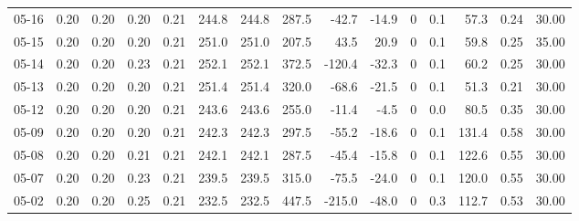 \begin{threeparttable}
{\begin{tabular}{lrrrrrrrrrrrrrr}
  05-16 &          0.20 &          0.20 &          0.20 &        0.21 &               244.8 &              244.8 &               287.5 &      -42.7 &        -14.9 &              0 &                 0.1 &             57.3 &            0.24 &                  30.00 \\
  05-15 &          0.20 &          0.20 &          0.20 &        0.21 &               251.0 &              251.0 &               207.5 &       43.5 &         20.9 &              0 &                 0.1 &             59.8 &            0.25 &                  35.00 \\
  05-14 &          0.20 &          0.20 &          0.23 &        0.21 &               252.1 &              252.1 &               372.5 &     -120.4 &        -32.3 &              0 &                 0.1 &             60.2 &            0.25 &                  30.00 \\
  05-13 &          0.20 &          0.20 &          0.20 &        0.21 &               251.4 &              251.4 &               320.0 &      -68.6 &        -21.5 &              0 &                 0.1 &             51.3 &            0.21 &                  30.00 \\
  05-12 &          0.20 &          0.20 &          0.20 &        0.21 &               243.6 &              243.6 &               255.0 &      -11.4 &         -4.5 &              0 &                 0.0 &             80.5 &            0.35 &                  30.00 \\
  05-09 &          0.20 &          0.20 &          0.20 &        0.21 &               242.3 &              242.3 &               297.5 &      -55.2 &        -18.6 &              0 &                 0.1 &            131.4 &            0.58 &                  30.00 \\
  05-08 &          0.20 &          0.20 &          0.21 &        0.21 &               242.1 &              242.1 &               287.5 &      -45.4 &        -15.8 &              0 &                 0.1 &            122.6 &            0.55 &                  30.00 \\
  05-07 &          0.20 &          0.20 &          0.23 &        0.21 &               239.5 &              239.5 &               315.0 &      -75.5 &        -24.0 &              0 &                 0.1 &            120.0 &            0.55 &                  30.00 \\
  05-02 &          0.20 &          0.20 &          0.25 &        0.21 &               232.5 &              232.5 &               447.5 &     -215.0 &        -48.0 &              0 &                 0.3 &            112.7 &            0.53 &                  30.00 \\

\end{tabular}}
\end{threeparttable}
